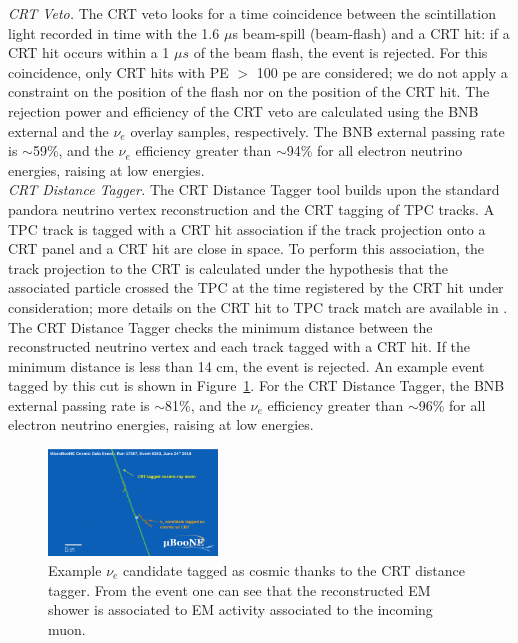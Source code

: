 \emph{CRT Veto.} %
The CRT veto looks for a time coincidence between the scintillation light recorded in time with the 1.6 $\mu$s beam-spill (beam-flash) and a CRT hit: if a CRT hit occurs within a 1 $\mu s$ of the beam flash, the event is rejected. For this coincidence, only CRT hits with PE $>$ 100 pe are considered; we do not apply a constraint on the position of the flash nor on the position of the CRT hit. 
The rejection power and efficiency of the CRT veto are calculated using the BNB external and the $\nu_e$ overlay samples, respectively. The BNB external passing rate is $\sim$59\%,  and the $\nu_e$ efficiency greater than $\sim$94\% for all electron neutrino energies, raising at low energies. \\


\emph{CRT Distance Tagger.} 
The CRT Distance Tagger tool builds upon the standard pandora neutrino vertex reconstruction and the CRT tagging of TPC tracks. A TPC track is tagged with a CRT hit association if the track projection onto a CRT panel and a CRT hit are close in space. 
To perform this association, the track projection to the CRT is calculated under the hypothesis that the associated particle crossed the TPC at the time registered by the CRT hit under consideration; more details on the CRT hit to TPC track match are available in \cite{bib:CRTPresel_Technote}.  The CRT Distance Tagger checks the minimum distance between the reconstructed neutrino vertex and each track tagged with a CRT hit. If the minimum distance is less than 14 cm, the event is rejected. An example event tagged by this cut is shown in Figure~\ref{fig:crtdist00}.  For the CRT Distance Tagger, the BNB external passing rate is $\sim$81\%,  and the $\nu_e$ efficiency greater than $\sim$96\% for all electron neutrino energies, raising at low energies. \\
 
\begin{figure}[h!]
\centering
\includegraphics[width=0.4\textwidth]{NuId-Ch2/Images/crttagger_01.png}
\caption{Example $\nu_e$ candidate tagged as cosmic thanks to the CRT distance tagger. From the event one can see that the reconstructed EM shower is associated to EM activity associated to the incoming muon.}
\label{fig:crtdist00}
\end{figure}

